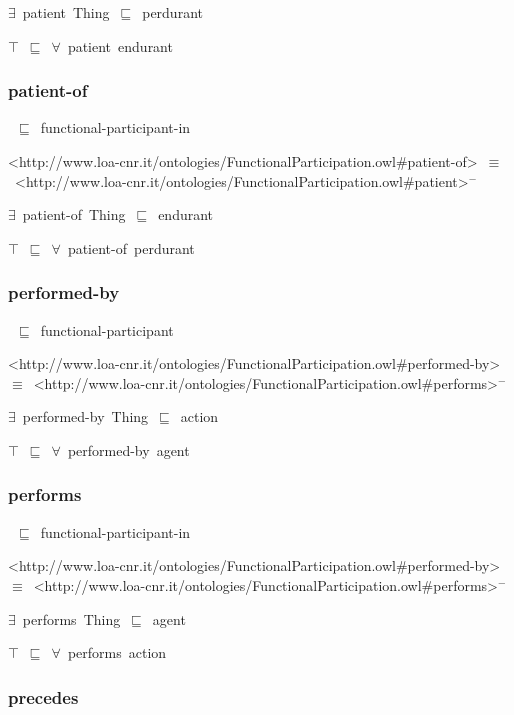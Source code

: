 \documentclass{article}
\begin{document}
\ensuremath{\exists}~patient~Thing~\ensuremath{\sqsubseteq}~perdurant

\ensuremath{\top}~\ensuremath{\sqsubseteq}~\ensuremath{\forall}~patient~endurant

\subsubsection*{patient-of}

~\ensuremath{\sqsubseteq}~functional-participant-in

<http://www.loa-cnr.it/ontologies/FunctionalParticipation.owl#patient-of>~\ensuremath{\equiv}~<http://www.loa-cnr.it/ontologies/FunctionalParticipation.owl#patient>\ensuremath{^-}

\ensuremath{\exists}~patient-of~Thing~\ensuremath{\sqsubseteq}~endurant

\ensuremath{\top}~\ensuremath{\sqsubseteq}~\ensuremath{\forall}~patient-of~perdurant

\subsubsection*{performed-by}

~\ensuremath{\sqsubseteq}~functional-participant

<http://www.loa-cnr.it/ontologies/FunctionalParticipation.owl#performed-by>~\ensuremath{\equiv}~<http://www.loa-cnr.it/ontologies/FunctionalParticipation.owl#performs>\ensuremath{^-}

\ensuremath{\exists}~performed-by~Thing~\ensuremath{\sqsubseteq}~action

\ensuremath{\top}~\ensuremath{\sqsubseteq}~\ensuremath{\forall}~performed-by~agent

\subsubsection*{performs}

~\ensuremath{\sqsubseteq}~functional-participant-in

<http://www.loa-cnr.it/ontologies/FunctionalParticipation.owl#performed-by>~\ensuremath{\equiv}~<http://www.loa-cnr.it/ontologies/FunctionalParticipation.owl#performs>\ensuremath{^-}

\ensuremath{\exists}~performs~Thing~\ensuremath{\sqsubseteq}~agent

\ensuremath{\top}~\ensuremath{\sqsubseteq}~\ensuremath{\forall}~performs~action

\subsubsection*{precedes}
\end{document}
